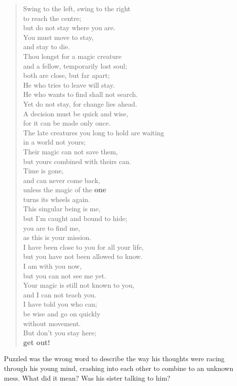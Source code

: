 \begin{quote}
Swing to the left, swing to the right\\
to reach the centre;\\
but do not stay where you are.\\

You must move to stay,\\
and stay to die.\\

Thou longst for a magic creature\\
and a fellow, temporarily lost soul;\\
both are close, but far apart;\\
He who tries to leave will stay.\\
He who wants to find shall not search.\\
Yet do not stay, for change lies ahead.\\

A decision must be quick and wise,\\
for it can be made only once.\\

The late creatures you long to hold are waiting\\
in a world not yours;\\
Their magic can not save them,\\
but yours combined with theirs can.\\

Time is gone,\\
and can never come back,\\
unless the magic of the \textbf{one}\\
turns its wheels again.\\

This singular being is me,\\
but I'm caught and bound to hide;\\
you are to find me,\\
as this is your mission.\\

I have been close to you for all your life,\\
but you have not been allowed to know.\\

I am with you now,\\
but you can not see me yet.\\
Your magic is still not known to you,\\
and I can not teach you.\\

I have told you who can;\\
be wise and go on quickly\\
without movement.\\

But don't you stay here;\\
\textbf{get out!}
\end{quote}
Puzzled was the wrong word to describe the way his thoughts were racing through his young mind, crashing into each other to combine to an unknown mess. 
What did it mean? Was his sister talking to him? 

